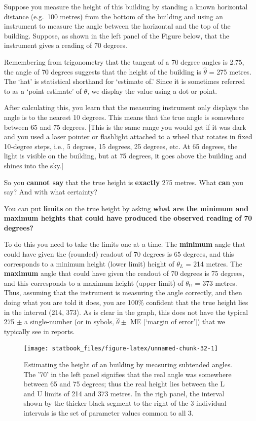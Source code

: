 \documentclass[]{book}
\begin{document}
Suppose you measure the height of this building by standing a known horizontal distance (e.g.~100 metres) from the bottom of the building and using an instrument to measure the angle between the horizontal and the top of the building. Suppose, as shown in the left panel of the Figure below, that the instrument gives a reading of 70 degrees.

Remembering from trigonometry that the tangent of a 70 degree angles is 2.75, the angle of 70 degrees suggests that the height of the building is \(\hat{\theta}\) = 275 metres. The `hat' is statistical shorthand for `estimate of.' Since it is sometimes referred to as a `point estimate' of \(\theta\), we display the value using a dot or point.

After calculating this, you learn that the measuring instrument only displays the angle is to the nearest 10 degrees. This means that the true angle is somewhere between 65 and 75 degrees. {[}This is the same range you would get if it was dark and you used a laser pointer or flashlight attached to a wheel that rotates in fixed 10-degree steps, i.e., 5 degrees, 15 degrees, 25 degrees, etc. At 65 degrees, the light is visible on the building, but at 75 degrees, it goes above the building and shines into the sky.{]}

So you \textbf{cannot say} that the true height is \textbf{exactly} 275 metres. What \textbf{can} you say? And with what certainty?

You can put \textbf{limits} on the true height by asking \textbf{what are the minimum and maximum heights that could have produced the observed reading of 70 degrees?}

To do this you need to take the limits one at a time. The \textbf{minimum} angle that could have given the (rounded) readout of 70 degrees is 65 degrees, and this corresponds to a minimum height (lower limit) height of \(\theta_L\) = 214 metres. The \textbf{maximum} angle that could have given the readout of 70 degrees is 75 degrees, and this corresponds to a maximum height (upper limit) of \(\theta_U\) = 373 metres. Thus, assuming that the instrument is measuring the angle correctly, and then doing what you are told it does, you are 100\% confident that the true height lies in the interval (214, 373). As is clear in the graph, this does not have the typical 275 \(\pm\) a single-number (or in sybols, \(\hat{\theta} \pm\) ME {[}`margin of error'{]}) that we typically see in reports.

\begin{figure}

{\centering \texttt{[image: statbook\_files/figure-latex/unnamed-chunk-32-1]} 

}

\caption{Estimating the height of an building by measuring subtended angles. The '70' in the left panel signifies that the real angle was somewhere between 65 and 75 degrees; thus the real height lies between the L and U limits of 214 and 373 metres. In the righ panel, the  interval shown by the thicker black segment to the right of the 3 individual intervals is the  set of parameter values common to all 3.}\label{fig:unnamed-chunk-32}
\end{figure}
\end{document}
